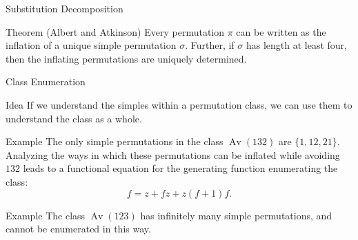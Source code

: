 \documentclass[xcolor=table,dvipsnames]{beamer}
\DeclareMathOperator{\Av}{Av}
\newcommand{\sg}{\sigma}
\begin{document}
\begin{frame}{Substitution Decomposition}
  \begin{block}{Theorem (Albert and Atkinson)}
    Every permutation $\pi$ can be written as the inflation of a unique
    simple permutation $\sg$. Further, if $\sg$ has length at least four,
    then the inflating permutations are uniquely determined. 
  \end{block}
\end{frame}


\begin{frame}{Class Enumeration}
  \begin{block}{Idea}
    If we understand the simples within a permutation class, we can use them to 
    understand the class as a whole. 
  \end{block}
  \pause
  \begin{block}{Example}
    The only simple permutations in the class $\Av(132)$ are $\{1, 12, 21\}$. 
    Analyzing the ways in which these permutations can be inflated while 
    avoiding $132$ leads to a functional equation for the generating function 
    enumerating the class:
    $$ f = z + fz + z(f+1)f.$$
  \end{block}
  \pause
  \begin{block}{Example}
    The class $\Av(123)$ has infinitely many simple permutations, and cannot be 
    enumerated in this way. 
  \end{block}
  
\end{frame}
\end{document}
